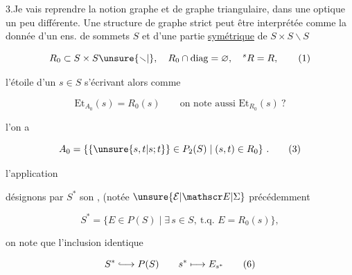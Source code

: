 
3.\quad Je vais reprendre la notion  graphe et de graphe triangulaire,
dans une optique un peu différente. Une structure
de graphe strict peut être interprétée comme la donnée
d'un  ens. de sommets $S$ et d'une partie
\uline{symétrique} de $S\times S\smallsetminus S$

\[
 R_0\subset S\times S\unsure{\smallsetminus|\vphantom{S}},\quad R_0\cap\mathrm{diag}=\varnothing,\quad{}^sR=R, \tag*{(1)}
\]

l'étoile d'un $s\in S$ s'écrivant alors comme

\[
 \mathrm{Et}_{A_0}(s)=R_0(s)\qquad \text{on note aussi }\mathrm{Et}_{R_0}(s)\ ? \tag*{(2)}
\]

 l'on a

\[
 A_0=\{\{\unsure{s,t|s;t}\}\in P_2(S)\mid(s,t)\in R_0\}\ . \tag*{(3)}
\]

  l'application


 désignons  par $S^*$ son ,
(notée $\unsure{\mathcal E|\mathscr E|\Sigma}$ précédemment

\[
 S^*=\{E\in P(S)\mid\exists\,s\in S,\ \text{t.q. }E=R_0(s)\}, \tag*{(5)}
\]

on note que l'inclusion identique

\[
 S^*\lhook\joinrel\longrightarrow P(S)\qquad s^*\longmapsto E_{s^*} \tag*{(6)}
\]

